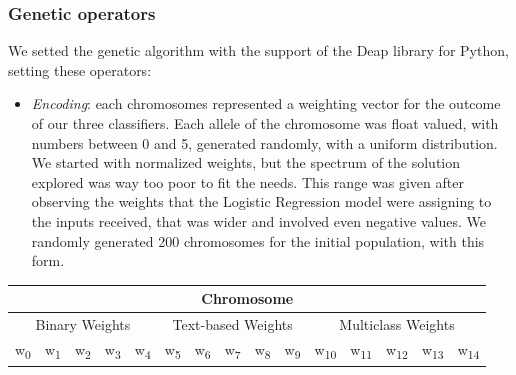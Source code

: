 \subsubsection{Genetic operators}

We setted the genetic algorithm with the support of the Deap library for Python, setting these operators:
\begin{itemize}
	\item[\PencilRight]\textit{Encoding}: each chromosomes represented a weighting vector for the outcome of our three classifiers. Each allele of the chromosome was float valued, with numbers between 0 and 5, generated randomly, with a uniform distribution. We started with normalized weights, but the spectrum of the solution explored was way too poor to fit the needs.
	This range was given after observing the weights that the Logistic Regression model were assigning to the inputs received, that was wider and involved even negative values.
	We randomly generated 200 chromosomes for the initial population, with this form.
\end{itemize}
	\begin{center}
		\begin{tabular}{@{}c|c|c|c|c|c|c|c|c|c|c|c|c|c|c@{}}
			\multicolumn{15}{c}{Chromosome} \\
			\hline
			\multicolumn{5}{c|}{Binary Weights} & 
			\multicolumn{5}{c|}{Text-based Weights} & 
			\multicolumn{5}{c}{Multiclass Weights}\\
			\hline
			w\textsubscript{0} &
			w\textsubscript{1} &
			w\textsubscript{2} &
			w\textsubscript{3} &
			w\textsubscript{4} &
			w\textsubscript{5} &
			w\textsubscript{6} &
			w\textsubscript{7} &
			w\textsubscript{8} &
			w\textsubscript{9} &
			w\textsubscript{10} &
			w\textsubscript{11} &
			w\textsubscript{12} &
			w\textsubscript{13} &
			w\textsubscript{14}\\
			\hline
		\end{tabular}\\
	\end{center}
